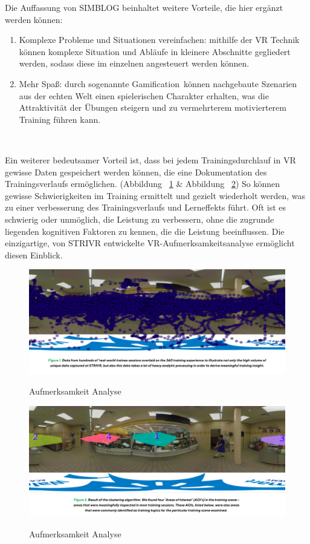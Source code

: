 Die Auffassung von SIMBLOG \citep{16} beinhaltet weitere Vorteile, die hier ergänzt werden können:

\begin{enumerate}
\item Komplexe Probleme und Situationen vereinfachen: mithilfe der VR Technik können komplexe Situation und Abläufe in kleinere Abschnitte gegliedert werden, sodass diese im einzelnen angesteuert werden können.
\item Mehr Spaß: durch sogenannte \glqq Gamification\grqq\ können nachgebaute Szenarien aus der echten Welt einen spielerischen Charakter erhalten, was die Attraktivität der Übungen steigern und zu vermehrterem motivierterem Training führen kann.
\end{enumerate}\

Ein weiterer bedeutsamer Vorteil ist, dass bei jedem Trainingsdurchlauf in VR gewisse Daten gespeichert werden können, die eine Dokumentation des Trainingsverlaufs ermöglichen. (Abbildung ~\ref{fig:intentionanalys1} \& Abbildung ~\ref{fig:intentionanalys2}) So können gewisse Schwierigkeiten im Training ermittelt und gezielt wiederholt werden, was zu einer verbesserung des Trainingsverlaufs und Lerneffekts führt. \glqq Oft ist es schwierig oder unmöglich, die Leistung zu verbessern, ohne die zugrunde liegenden kognitiven Faktoren zu kennen, die die Leistung beeinflussen. Die einzigartige, von STRIVR entwickelte VR-Aufmerksamkeitsanalyse ermöglicht diesen Einblick.\grqq\ \citep{18}

\begin{figure}[ht]
\vspace*{1em}
\centering
\caption{Aufmerksamkeit Analyse}
\includegraphics[width=\textwidth]{images/intentionanalys1.png}
\label{fig:intentionanalys1}
\end{figure}

\begin{figure}[ht]
\vspace*{1em}
\centering
\caption{Aufmerksamkeit Analyse}
\includegraphics[width=\textwidth]{images/intentionanalys2.png}
\label{fig:intentionanalys2} 
\end{figure}

